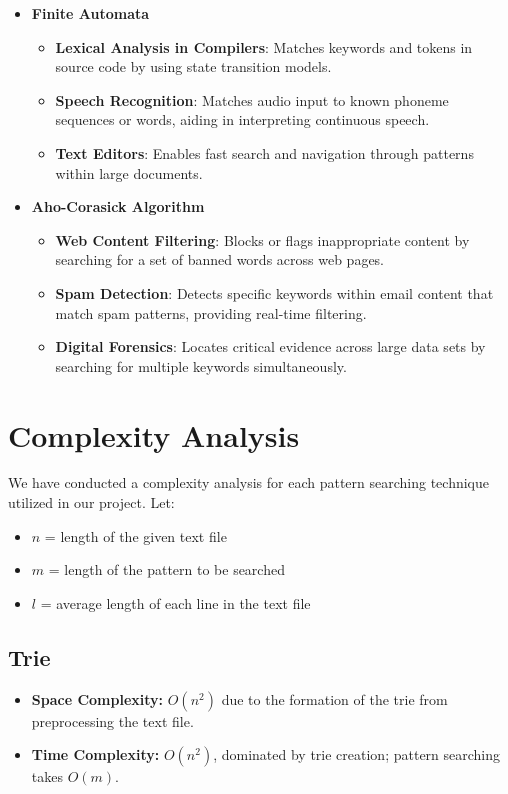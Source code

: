 \documentclass[11pt,a4paper]{article}
\begin{document}
\begin{itemize}
    \item \textbf{Finite Automata}
    \begin{itemize}
        \item \textbf{Lexical Analysis in Compilers}: Matches keywords and tokens in source code by using state transition models.
        \item \textbf{Speech Recognition}: Matches audio input to known phoneme sequences or words, aiding in interpreting continuous speech.
        \item \textbf{Text Editors}: Enables fast search and navigation through patterns within large documents.
    \end{itemize}

    \item \textbf{Aho-Corasick Algorithm}
    \begin{itemize}
        \item \textbf{Web Content Filtering}: Blocks or flags inappropriate content by searching for a set of banned words across web pages.
        \item \textbf{Spam Detection}: Detects specific keywords within email content that match spam patterns, providing real-time filtering.
        \item \textbf{Digital Forensics}: Locates critical evidence across large data sets by searching for multiple keywords simultaneously.
    \end{itemize}
\end{itemize}

\section{Complexity Analysis}
We have conducted a complexity analysis for each pattern searching technique utilized in our project. Let:
\begin{itemize}
    \item \( n \) = length of the given text file
    \item \( m \) = length of the pattern to be searched
    \item \( l \) = average length of each line in the text file
\end{itemize}

\subsection{Trie}
\begin{itemize}
    \item \textbf{Space Complexity:} \( O(n^2) \) due to the formation of the trie from preprocessing the text file.
    \item \textbf{Time Complexity:} \( O(n^2) \), dominated by trie creation; pattern searching takes \( O(m) \).
\end{itemize}
\end{document}
